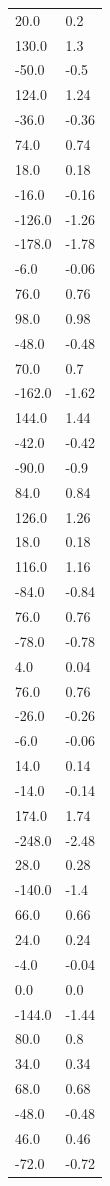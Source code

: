 \begin{longtable}{ll}
20.0 & 0.2 \\
130.0 & 1.3 \\
-50.0 & -0.5 \\
124.0 & 1.24 \\
-36.0 & -0.36 \\
74.0 & 0.74 \\
18.0 & 0.18 \\
-16.0 & -0.16 \\
-126.0 & -1.26 \\
-178.0 & -1.78 \\
-6.0 & -0.06 \\
76.0 & 0.76 \\
98.0 & 0.98 \\
-48.0 & -0.48 \\
70.0 & 0.7 \\
-162.0 & -1.62 \\
144.0 & 1.44 \\
-42.0 & -0.42 \\
-90.0 & -0.9 \\
84.0 & 0.84 \\
126.0 & 1.26 \\
18.0 & 0.18 \\
116.0 & 1.16 \\
-84.0 & -0.84 \\
76.0 & 0.76 \\
-78.0 & -0.78 \\
4.0 & 0.04 \\
76.0 & 0.76 \\
-26.0 & -0.26 \\
-6.0 & -0.06 \\
14.0 & 0.14 \\
-14.0 & -0.14 \\
174.0 & 1.74 \\
-248.0 & -2.48 \\
28.0 & 0.28 \\
-140.0 & -1.4 \\
66.0 & 0.66 \\
24.0 & 0.24 \\
-4.0 & -0.04 \\
0.0 & 0.0 \\
-144.0 & -1.44 \\
80.0 & 0.8 \\
34.0 & 0.34 \\
68.0 & 0.68 \\
-48.0 & -0.48 \\
46.0 & 0.46 \\
-72.0 & -0.72 \\

\end{longtable}
